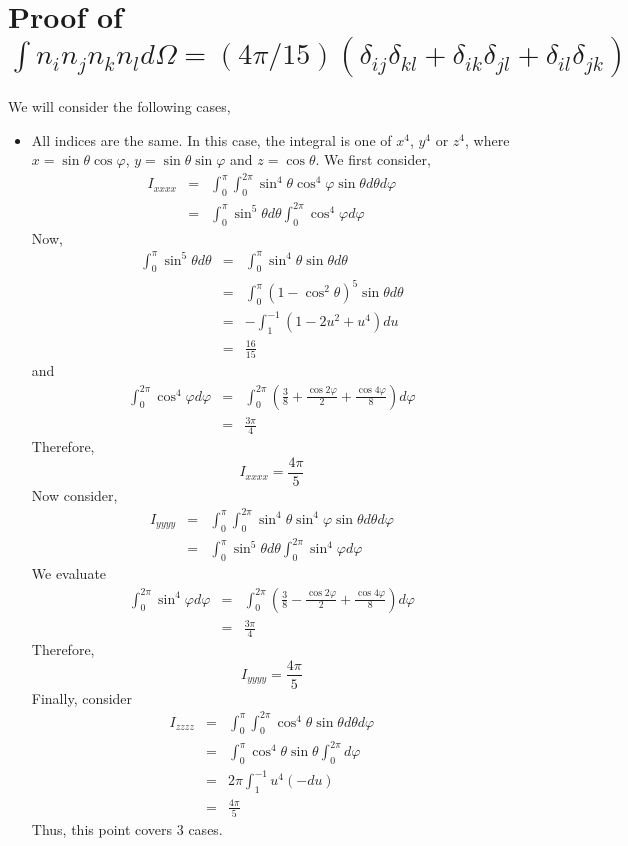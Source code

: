 \section{Proof of \texorpdfstring{$\int n_i n_j n_k n_l d\Omega = (4\pi/15)(\delta_{ij}\delta_{kl}+\delta_{ik}\delta_{jl}+\delta_{il}\delta_{jk})$}{}}
We will consider the following cases,
\begin{itemize}
\item All indices are the same. In this case, the integral is one of $x^4$, $y^4$ or $z^4$, where $x = \sin\theta\cos\varphi$, $y = \sin\theta\sin\varphi$ and $z = \cos\theta$.
We first consider,
\begin{eqnarray*}
I_{xxxx} &=& \int_0^\pi \int_0^{2\pi} \sin^4\theta \cos^4\varphi \sin\theta d\theta d\varphi \\
 &=& \int_0^\pi\sin^5\theta d\theta \int_0^{2\pi}\cos^4\varphi d\varphi
\end{eqnarray*}
Now,
\begin{eqnarray*}
\int_0^\pi\sin^5\theta d\theta &=& \int_0^\pi\sin^4\theta \sin\theta d\theta \\
 &=& \int_0^\pi(1 - \cos^2\theta)^5 \sin\theta d\theta \\
 &=& -\int_1^{-1}(1 - 2u^2 + u^4)du \\
 &=& \frac{16}{15}
\end{eqnarray*}
and
\begin{eqnarray*}
\int_0^{2\pi}\cos^4\varphi d\varphi &=& \int_0^{2\pi}\left(\frac{3}{8} + \frac{\cos 2\varphi}{2} + \frac{\cos 4\varphi}{8}\right)d\varphi \\
 &=& \frac{3\pi}{4}
\end{eqnarray*}
Therefore,
\[
I_{xxxx} = \frac{4\pi}{5}
\]
Now consider,
\begin{eqnarray*}
I_{yyyy} &=& \int_0^\pi \int_0^{2\pi} \sin^4\theta \sin^4\varphi \sin\theta d\theta d\varphi \\
 &=& \int_0^\pi\sin^5\theta d\theta \int_0^{2\pi}\sin^4\varphi d\varphi
\end{eqnarray*}
We evaluate
\begin{eqnarray*}
\int_0^{2\pi}\sin^4\varphi d\varphi &=& \int_0^{2\pi}\left(\frac{3}{8} - \frac{\cos 2\varphi}{2} + \frac{\cos 4\varphi}{8}\right)d\varphi \\
 &=& \frac{3\pi}{4}
\end{eqnarray*}
Therefore,
\[
I_{yyyy} = \frac{4\pi}{5}
\]
Finally, consider
\begin{eqnarray*}
I_{zzzz} &=& \int_0^\pi \int_0^{2\pi} \cos^4\theta \sin\theta d\theta d\varphi \\
 &=& \int_0^\pi \cos^4\theta \sin\theta \int_0^{2\pi}d\varphi \\
 &=& 2\pi\int_1^{-1}u^4(-du) \\
 &=& \frac{4\pi}{5}
\end{eqnarray*}
Thus, this point covers $3$ cases.


\end{itemize}
